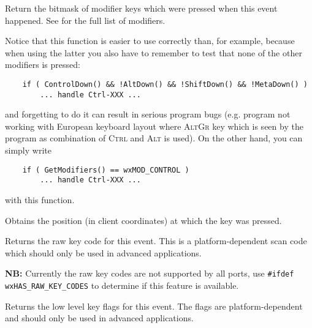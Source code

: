 Return the bitmask of modifier keys which were pressed when this event
happened. See  for the full list
of modifiers.

Notice that this function is easier to use correctly than, for example, 
 because when using the latter you
also have to remember to test that none of the other modifiers is pressed:

\begin{verbatim}
    if ( ControlDown() && !AltDown() && !ShiftDown() && !MetaDown() )
        ... handle Ctrl-XXX ...
\end{verbatim}

and forgetting to do it can result in serious program bugs (e.g. program not
working with European keyboard layout where \textsc{AltGr} key which is seen by
the program as combination of \textsc{Ctrl} and \textsc{Alt} is used). On the
other hand, you can simply write

\begin{verbatim}
    if ( GetModifiers() == wxMOD_CONTROL )
        ... handle Ctrl-XXX ...
\end{verbatim}

with this function.


\label{wxkeyeventgetposition}



Obtains the position (in client coordinates) at which the key was pressed.


\label{wxkeyeventgetrawkeycode}


Returns the raw key code for this event. This is a platform-dependent scan code
which should only be used in advanced applications.

{\bf NB:} Currently the raw key codes are not supported by all ports, use
{\tt\#ifdef wxHAS\_RAW\_KEY\_CODES} to determine if this feature is available.


\label{wxkeyeventgetrawkeyflags}


Returns the low level key flags for this event. The flags are
platform-dependent and should only be used in advanced applications.

